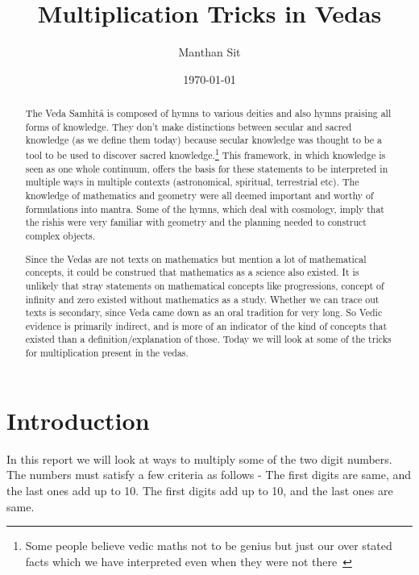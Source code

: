 \documentclass[12pt]{article}
\begin{document}
\title{\textbf{Multiplication Tricks in Vedas}}
\author{Manthan Sit}
\date{\small{\today}}
\maketitle


\begin{abstract}

The Veda Samhitâ is composed of hymns to various deities and also hymns praising all forms of knowledge. They don't make distinctions between secular and sacred knowledge (as we define them today) because secular knowledge was thought to be a tool to be used to discover sacred knowledge.\footnote{Some people believe vedic maths not to be genius but just our over stated facts which we have interpreted even when they were not there~\cite{fraud} } This framework, in which knowledge is seen as one whole continuum, offers the basis for these statements to be interpreted in multiple ways in multiple contexts (astronomical, spiritual, terrestrial etc). The knowledge of mathematics and geometry were all deemed important and worthy of formulations into mantra. Some of the hymns, which deal with cosmology, imply that the rishis were very familiar with geometry and the planning needed to construct complex objects.~\cite{wiki}

Since the Vedas are not texts on mathematics but mention a lot of mathematical concepts, it could be construed that mathematics as a science also existed. It is unlikely that stray statements on mathematical concepts like progressions, concept of infinity and zero existed without mathematics as a study. Whether we can trace out texts is secondary, since Veda came down as an oral tradition for very long. So Vedic evidence is primarily indirect, and is more of an indicator of the kind of concepts that existed than a definition/explanation of those. Today we will look at some of the tricks for multiplication present in the vedas.~\cite{vedic}

\end{abstract}

\vspace{10mm}

\section{Introduction}

In this report we will look at ways to multiply some of the two digit numbers. The numbers must satisfy a few criteria as follows -\newline
\textbullet  \hspace{5pt}The first digits are same, and the last ones add up to 10.\newline
\textbullet  \hspace{5pt}The first digits add up to 10, and the last ones are same.\newline
\end{document}

